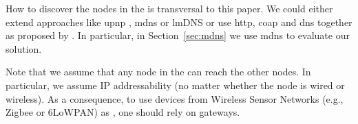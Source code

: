 How to discover the nodes in the \Space{} is transversal to this paper.
We could either extend approaches like \ac{upnp} , \ac{mdns}  or lmDNS \citep{jara_light-weight_2012} or use \acs{http}, \ac{coap}  and \ac{dns} together as proposed by \citet{ishaq_facilitating_2012}.
In particular, in Section~\ref{sec:mdns} we use \ac{mdns} to evaluate our solution.

Note that we assume that any node in the \Space{} can reach the other nodes.
In particular, we assume IP addressability (no matter whether the node is wired or wireless).
As a consequence, to use devices from Wireless Sensor Networks (e.g., Zigbee or 6LoWPAN) as \providers{}, one should rely on gateways.



%
%



